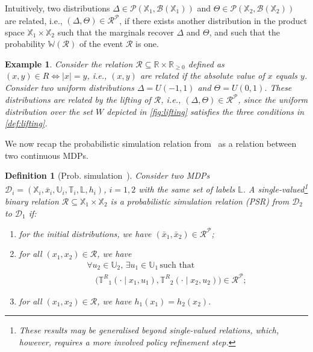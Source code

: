 \documentclass[letterpaper, 10 pt, conference]{ieeeconf}  %
\newtheorem{example}{Example}
\newtheorem{definition}{Definition}
\newcommand*{\States}{\ensuremath{\mathbb{X}}}
\newcommand*{\Actions}{\ensuremath{\mathbb{U}}}
\newcommand*{\Labels}{\ensuremath{\mathbb{L}}}
\newcommand*{\initState}{\ensuremath{\bar{x}}}
\newcommand*{\transfunc}{\ensuremath{\mathbb{T}}}
\newcommand*{\transfuncR}{\ensuremath{\mathbb{T}^R}}
\newcommand*{\labelfunc}{\ensuremath{h}}
\newcommand*{\mdp}{\ensuremath{\mathcal{D}}}
\newcommand*{\MDPi}[1]{\ensuremath{\tuple{\States_{#1},{\initState}_{#1},\Actions_{#1},\transfunc_{#1},\Labels,\labelfunc_{#1}}}}
\newcommand*{\RR}{\mathbb{R}}
\newcommand*{\tuple}[1]{\left(#1\right)}
\newcommand*{\Relation}{\mathcal{R}}
\newcommand*{\liftRelation}{\mathcal{R}^\mathcal{P}}
\newcommand*{\distr}[1]{\mathcal{P}(#1)}
\newcommand*{\Borel}[1]{\ensuremath{\mathcal{B}(#1)}}
\begin{document}
Intuitively, two distributions $\Delta \in \distr{\States_1, \Borel{\States_1}}$ and $\Theta \in \distr{\States_2, \Borel{\States_2}}$ are related, i.e., $(\Delta, \Theta) \in \liftRelation$, if there exists another distribution in the product space $\States_1 \times \States_2$ such that the marginals recover $\Delta$ and $\Theta$, and such that the probability $\mathbb{W}(\Relation)$ of the event $\Relation$ is one.

\begin{example}
    \label{example:lifting}
    Consider the relation $\Relation \subseteq \RR \times \RR_{\geq 0}$ defined as $(x,y) \in R \iff |x| = y$, i.e., $(x,y)$ are related if the absolute value of $x$ equals $y$.
    Consider two uniform distributions $\Delta = U(-1,1)$ and $\Theta = U(0,1)$.
    These distributions are related by the lifting of $\Relation$, i.e., $(\Delta, \Theta) \in \liftRelation$, since the uniform distribution over the set $W$ depicted in \cref{fig:lifting} satisfies the three conditions in \cref{def:lifting}.
\end{example}

We now recap the probabilistic simulation relation from~\cite{DBLP:journals/siamco/HaesaertSA17} as a relation between two continuous MDPs.

\begin{definition}[Prob. simulation~\cite{DBLP:journals/siamco/HaesaertSA17}]
    \label{def:PSR}
    Consider two MDPs $\mdp_i = \MDPi{i}$, $i=1,2$ with the same set of labels $\Labels$.
    A single-valued\footnote{These results may be generalised beyond single-valued relations, which, however, requires a more involved policy refinement step.} binary relation $\Relation \subseteq \States_1 \times \States_2$ is a \emph{probabilistic simulation relation (PSR)} from $\mdp_2$ to $\mdp_1$ if:
    \begin{enumerate}
        \item %
        for the initial distributions, we have $(\initState_1, \initState_2) \in \liftRelation$;
        \item %
        for all $(x_1, x_2) \in \Relation$, we have%
        \begin{equation}
        \begin{split}
            \label{eq:PSR_next}
            &\forall u_2 \in \Actions_2, \, \exists u_1 \in \Actions_1 \, \text{such that}
            \\
            &\quad \big( \transfuncR_1(\cdot \mid x_1, u_1), \transfuncR_2(\cdot \mid x_2, u_2) \big) \in \liftRelation;
        \end{split}
        \end{equation}
        \item %
        for all $(x_1, x_2) \in \Relation$, we have $\labelfunc_1(x_1) = \labelfunc_2(x_2)$.
    \end{enumerate}
\end{definition}
\end{document}
